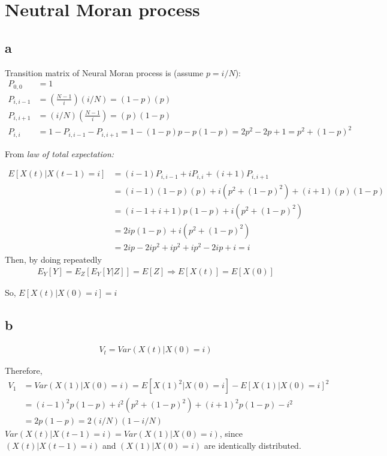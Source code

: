 \setcounter{chapter}{4}
\setcounter{section}{0}
\section{Neutral Moran process}
\subsection{a}
Transition matrix of Neural Moran  process is (assume $p = i/N$):\\
\begin{align*}
P_{0,0} &= 1\\
P_{i,i-1} &= (\frac{N-1}{i}) (i/N) = (1-p) (p)\\
P_{i,i+1} &= (i/N) (\frac{N-1}{i}) = (p) (1-p)\\
P_{i,i} &= 1 - P_{i,i-1} - P_{i,i+1} = 1-(1-p)p-p(1-p) = 2p^2-2p+1 = p^2+(1-p)^2
\end{align*}

From \textit{law of total expectation:}

\begin{align*}
 E[X(t)|X(t-1) = i]&= (i-1)P_{i,i-1} +i P_{i,i}+ (i+1) P_{i,i+1}\\
  &= (i-1)(1-p) (p) + i (p^2+(1-p)^2) + (i+1) (p) (1-p)\\
&= (i-1+i+1)p(1-p) + i (p^2+(1-p)^2) \\
 &= 2 i p (1-p) + i (p^2+(1-p)^2)\\
&= 2ip - 2ip^2 + ip^2+ ip^2 - 2ip + i = i
\end{align*}
Then, by doing repeatedly
\begin{align}
E_{Y}[Y] = E_{Z}[E_{Y}[Y|Z]] = E[Z] \Rightarrow E[X(t)] = E[X(0)]
\end{align}

So, $E[X(t)|X(0) = i] = i$

\subsection{b}

\begin{align}
V_t = Var(X(t)|X(0) = i)
\end{align}

Therefore,
\begin{align*}
V_1 &= Var(X(1)|X(0) = i) = E[X(1)^2|X(0) = i] - E[X(1)|X(0) = i]^2\\ 
&= (i-1)^2 p (1-p) + i^2 (p^2 + (1 - p)^2) + (i+1)^2 p (1-p) - i^2\\ 
&= 2 p (1-p) = 2 (i/N)(1-i/N)
\end{align*}
$Var(X(t)|X(t-1) = i) = Var(X(1)|X(0) = i)$, since $(X(t)|X(t-1) = i)$ and $(X(1)|X(0) = i)$ are identically distributed.\\

